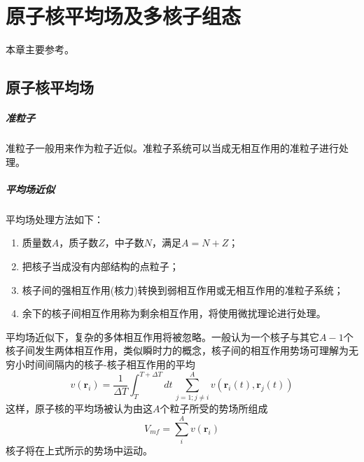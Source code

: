 \chapter{原子核平均场及多核子组态}

本章主要参考\citet[][Chap. 3]{suhonen-NtoN}。
\section{原子核平均场}

\paragraph*{准粒子} 准粒子一般用来作为粒子近似。准粒子系统可以当成无相互作用的准粒子进行处理。

\paragraph*{平均场近似} 
平均场处理方法如下：
\begin{enumerate}
	\item 质量数$A$，质子数$Z$，中子数$N$，满足$A=N+Z$；
	\item 把核子当成没有内部结构的点粒子；
	\item 核子间的强相互作用(核力)转换到弱相互作用或无相互作用的准粒子系统；
	\item 余下的核子间相互作用称为剩余相互作用，将使用微扰理论进行处理。
\end{enumerate}

平均场近似下，复杂的多体相互作用将被忽略。一般认为一个核子与其它$A-1$个核子间发生两体相互作用，类似瞬时力的概念，核子间的相互作用势场可理解为无穷小时间间隔内的核子-核子相互作用的平均
\begin{equation}
	v(\bm{r}_i) = \frac{1}{\Delta T} \int_{T}^{T + \Delta T} dt\, \sum_{j = 1; j \neq i}^{A} v(\bm{r}_i(t), \bm{r}_j(t))
\end{equation}
这样，原子核的平均场被认为由这$A$个粒子所受的势场所组成
\begin{equation}
	V_{mf} = \sum_{i}^{A} v(\bm{r}_i)
\end{equation}
核子将在上式所示的势场中运动。

